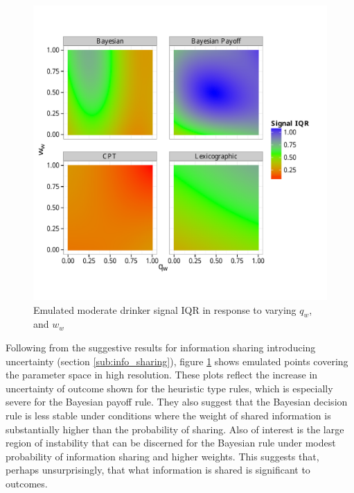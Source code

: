 \begin{figure}[H]
\begin{adjustbox}{center}\includegraphics[width=119mm]{figures/unfixed_emu_sig_iqr}\end{adjustbox}
\caption{Emulated moderate drinker signal IQR in response to varying \(q_{w}\), and \(w_{w}\)}
\label{fig:emulated_sharing_iqr}
\end{figure}

Following from the suggestive results for information sharing introducing uncertainty (section \ref{sub:info_sharing}), figure \ref{fig:emulated_sharing_iqr} shows emulated points covering the parameter space in high resolution. These plots reflect the increase in uncertainty of outcome shown for the heuristic type rules, which is especially severe for the Bayesian payoff rule. They also suggest that the Bayesian decision rule is less stable under conditions where the weight of shared information is substantially higher than the probability of sharing. Also of interest is the large region of instability that can be discerned for the Bayesian rule under modest probability of information sharing and higher weights. This suggests that, perhaps unsurprisingly, that what information is shared is significant to outcomes.

